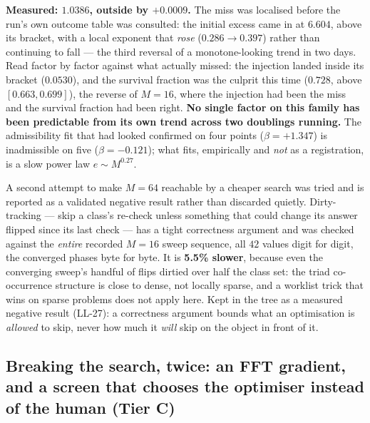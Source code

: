 \documentclass[11pt,a4paper]{article}
\newcommand{\tC}{\textcolor{TierC}{\textbf{Tier C}}}
\theoremstyle{definition}
\theoremstyle{plain}
\begin{document}
\textbf{Measured: $1.0386$, outside by $+0.0009$.} The miss was localised before the run's own
outcome table was consulted: the initial excess came in at $6.604$, above its bracket, with a
local exponent that \emph{rose} ($0.286\to0.397$) rather than continuing to fall --- the third
reversal of a monotone-looking trend in two days. Read factor by factor against what actually
missed: the injection landed inside its bracket ($0.0530$), and the survival fraction was the
culprit this time ($0.728$, above $[0.663,0.699]$), the reverse of $M=16$, where the injection
had been the miss and the survival fraction had been right. \textbf{No single factor on this
family has been predictable from its own trend across two doublings running.} The admissibility
fit that had looked confirmed on four points ($\beta=+1.347$) is inadmissible on five
($\beta=-0.121$); what fits, empirically and \emph{not} as a registration, is a slow power law
$e\sim M^{0.27}$.

A second attempt to make $M=64$ reachable by a cheaper search was tried and is reported as a
validated negative result rather than discarded quietly. Dirty-tracking --- skip a class's
re-check unless something that could change its answer flipped since its last check --- has a
tight correctness argument and was checked against the \emph{entire} recorded $M=16$ sweep
sequence, all $42$ values digit for digit, the converged phases byte for byte. It is
\textbf{5.5\% slower}, because even the converging sweep's handful of flips dirtied over half
the class set: the triad co-occurrence structure is close to dense, not locally sparse, and a
worklist trick that wins on sparse problems does not apply here. Kept in the tree as a measured
negative result (LL-27): a correctness argument bounds what an optimisation is \emph{allowed} to
skip, never how much it \emph{will} skip on the object in front of it.

\subsection{Breaking the search, twice: an FFT gradient, and a screen that chooses the
optimiser instead of the human (\tC{})}
\label{sec:spectral}
\end{document}
